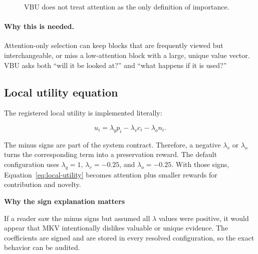 \documentclass[11pt]{article}
\newcommand{\why}{\paragraph{Why this is needed.}}
\newenvironment{plainbox}[1]{%
  \begin{center}\begin{minipage}{0.94\linewidth}
  \colorbox{mklight}{\parbox{0.965\linewidth}{\textbf{#1}\par\smallskip}}
  \vspace{-0.5em}\small
}{%
  \end{minipage}\end{center}
}
\begin{document}
\begin{figure}[htbp]
\centering
{}
\caption{VBU does not treat attention as the only definition of importance.}
\label{fig:utility}
\end{figure}

\why Attention-only selection can keep blocks that are frequently viewed but interchangeable,
or miss a low-attention block with a large, unique value vector. VBU asks both ``will it be
looked at?'' and ``what happens if it is used?''

\subsection{Local utility equation}

The registered local utility is implemented literally:

\begin{equation}
  u_i = \lambda_q p_i - \lambda_v c_i - \lambda_o n_i .
  \label{eq:local-utility}
\end{equation}

The minus signs are part of the system contract. Therefore, a negative $\lambda_v$ or
$\lambda_o$ turns the corresponding term into a preservation reward. The default configuration
uses $\lambda_q=1$, $\lambda_v=-0.25$, and $\lambda_o=-0.25$. With those signs,
Equation~\ref{eq:local-utility} becomes attention plus smaller rewards for contribution and
novelty.

\begin{plainbox}{Why the sign explanation matters}
If a reader saw the minus signs but assumed all $\lambda$ values were positive, it would appear
that MKV intentionally dislikes valuable or unique evidence. The coefficients are signed and are
stored in every resolved configuration, so the exact behavior can be audited.
\end{plainbox}
\end{document}
